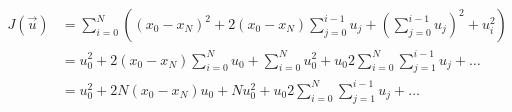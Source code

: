 \documentclass{article}
\begin{document}
\thispagestyle{empty}

\begin{align*}
J(\vec{u}) & = \sum\limits_{i=0}^N \left((x_0-x_N)^2 + 2(x_0-x_N)\sum\limits_{j=0}^{i-1}u_j+\left(\sum\limits_{j=0}^{i-1}u_j\right)^2 + u_i^2\right)\\
& = u_0^2 + 2(x_0-x_N)\sum\limits_{i=0}^N u_0 +  \sum\limits_{i=0}^N u_0^2 + u_0 2 \sum\limits_{i=0}^N \sum\limits_{j=1}^{i-1}u_j + \dots\\
& = u_0^2 + 2N(x_0-x_N) u_0 + N u_0^2 +  u_0  2\sum\limits_{i=0}^N \sum\limits_{j=1}^{i-1}u_j + \dots
\end{align*}
\end{document}

